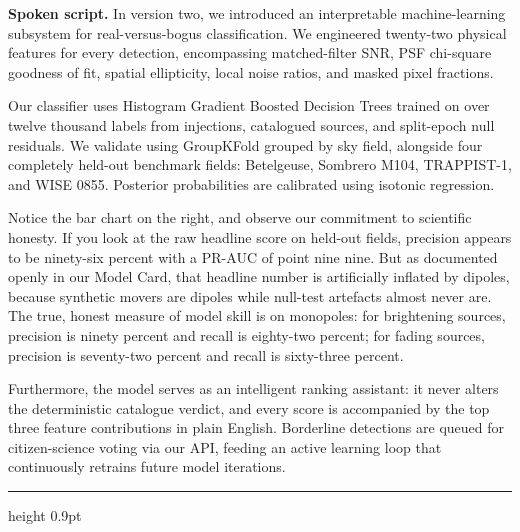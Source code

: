 \documentclass[11pt,a4paper]{article}
\newcommand{\code}[1]{\texttt{\small\detokenize{#1}}}
\newcommand{\slidehead}[3]{%
  \sbox{\slideheadbox}{\large\bfseries Slide #1 --- #2\hspace{1em plus 1fill}#3}%
  \noindent\ifdim\wd\slideheadbox>\linewidth
    \resizebox{\linewidth}{!}{\usebox{\slideheadbox}}%
  \else
    \makebox[\linewidth][s]{\usebox{\slideheadbox}}%
  \fi\par
  \vspace{2pt}\hrule height 0.9pt\vspace{8pt}}
\begin{document}
{}

\textbf{Spoken script.} In version two, we introduced an interpretable machine-learning subsystem for real-versus-bogus classification. We engineered twenty-two physical features for every detection, encompassing matched-filter SNR, PSF chi-square goodness of fit, spatial ellipticity, local noise ratios, and masked pixel fractions.

Our classifier uses Histogram Gradient Boosted Decision Trees trained on over twelve thousand labels from injections, catalogued sources, and split-epoch null residuals. We validate using GroupKFold grouped by sky field, alongside four completely held-out benchmark fields: Betelgeuse, Sombrero M104, TRAPPIST-1, and WISE 0855. Posterior probabilities are calibrated using isotonic regression.

Notice the bar chart on the right, and observe our commitment to scientific honesty. If you look at the raw headline score on held-out fields, precision appears to be ninety-six percent with a PR-AUC of point nine nine. But as documented openly in our Model Card, that headline number is artificially inflated by dipoles, because synthetic movers are dipoles while null-test artefacts almost never are. The true, honest measure of model skill is on monopoles: for brightening sources, precision is ninety percent and recall is eighty-two percent; for fading sources, precision is seventy-two percent and recall is sixty-three percent.

Furthermore, the model serves as an intelligent ranking assistant: it never alters the deterministic catalogue verdict, and every score is accompanied by the top three feature contributions in plain English. Borderline detections are queued for citizen-science voting via our API, feeding an active learning loop that continuously retrains future model iterations.
\newpage
\slidehead{21}{Multi-factor combined evidence engine}{0:50}
\end{document}
